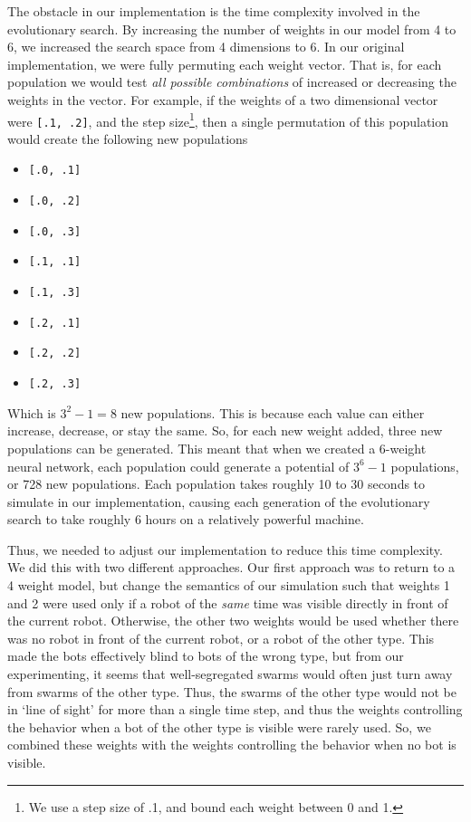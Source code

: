 The obstacle in our implementation is the time complexity involved in the evolutionary search.
By increasing the number of weights in our model from 4 to 6, we increased the search space from 4 dimensions to 6. 
In our original implementation, we were fully permuting each weight vector.
That is, for each population we would test \emph{all possible combinations} of increased or decreasing the weights in the vector. 
For example, if the weights of a two dimensional vector were \texttt{[.1, .2]}, and the step size\footnote{We use a step size of .1, and bound each weight between 0 and 1.}, then a single permutation of this population would create the following new populations
\begin{itemize}
    \item \texttt{[.0, .1]}
    \item \texttt{[.0, .2]}
    \item \texttt{[.0, .3]}
    \item \texttt{[.1, .1]}
    \item \texttt{[.1, .3]}
    \item \texttt{[.2, .1]}
    \item \texttt{[.2, .2]}
    \item \texttt{[.2, .3]}
\end{itemize}

Which is $3^2 - 1 = 8$ new populations. 
This is because each value can either increase, decrease, or stay the same. 
So, for each new weight added, three new populations can be generated. 
This meant that when we created a 6-weight neural network, each population could generate a potential of $3^6 - 1$ populations, or 728 new populations.
Each population takes roughly 10 to 30 seconds to simulate in our implementation, causing each generation of the evolutionary search to take roughly 6 hours on a relatively powerful machine. 

Thus, we needed to adjust our implementation to reduce this time complexity. 
We did this with two different approaches. 
Our first approach was to return to a 4 weight model, but change the semantics of our simulation such that weights 1 and 2 were used only if a robot of the \emph{same} time was visible directly in front of the current robot.
Otherwise, the other two weights would be used whether there was no robot in front of the current robot, or a robot of the other type. 
This made the bots effectively blind to bots of the wrong type, but from our experimenting, it seems that well-segregated swarms would often just turn away from swarms of the other type.
Thus, the swarms of the other type would not be in `line of sight' for more than a single time step, and thus the weights controlling the behavior when a bot of the other type is visible were rarely used. 
So, we combined these weights with the weights controlling the behavior when no bot is visible. 

